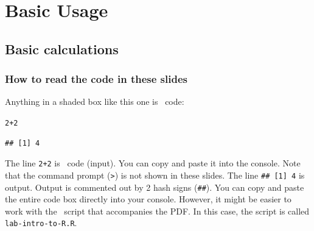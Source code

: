 \documentclass[color=usenames,dvipsnames]{beamer}\usepackage[]{graphicx}\usepackage[]{color}
\makeatletter
\newcommand{\hlnum}[1]{\textcolor[rgb]{0.69,0.494,0}{#1}}%
\newcommand{\hlopt}[1]{\textcolor[rgb]{0,0,0}{#1}}%
\newenvironment{kframe}{%
 \def\at@end@of@kframe{}%
 \ifinner\ifhmode%
  \def\at@end@of@kframe{\end{minipage}}%
  \begin{minipage}{\columnwidth}%
 \fi\fi%
 \def\FrameCommand##1{\hskip\@totalleftmargin \hskip-\fboxsep
 \colorbox{shadecolor}{##1}\hskip-\fboxsep
     \hskip-\linewidth \hskip-\@totalleftmargin \hskip\columnwidth}%
 \MakeFramed {\advance\hsize-\width
   \@totalleftmargin\z@ \linewidth\hsize
   \@setminipage}}%
 {\par\unskip\endMakeFramed%
 \at@end@of@kframe}
\newenvironment{knitrout}{}{} %
\newcommand{\inr}[1]{\colorbox{inlinecolor}{\texttt{#1}}}
\makeatother
\begin{document}
\section{Basic Usage}





\subsection{Basic calculations}




\begin{frame}[fragile]
  \frametitle{How to read the code in these slides}
  Anything in a shaded box like this one is \R~code:
\begin{knitrout}
\color{fgcolor}\begin{kframe}
\begin{alltt}
\hlnum{2}\hlopt{+}\hlnum{2}
\end{alltt}
\begin{verbatim}
## [1] 4
\end{verbatim}
\end{kframe}
\end{knitrout}
\pause \vfill
  The line \inr{2+2} is \R~code (\alert{input}). You can copy
  and paste it into the console. Note that the command prompt (\verb+>+) is
  not shown in these slides.
\vfill
  The line \inr{\#\# [1] 4} is \alert{output}. Output is
  commented out by 2 hash signs (\texttt{\#\#}).
\pause \vfill
  You can copy and paste the entire code box directly into your
  console. However, it might be easier to work with the \R~script
  that accompanies the PDF. In this case, the script is called
  \texttt{lab-intro-to-R.R}.
\end{frame}
\end{document}
